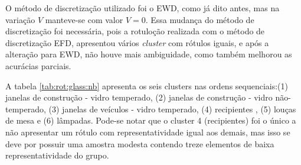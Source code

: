 O método de discretização utilizado foi o EWD, como já dito antes, mas na variação ${V}$  manteve-se com valor ${V=0}$. Essa mudança do método de discretização foi necessária, pois a rotuloção realizada com o método de discretização EFD, apresentou vários \textit{cluster} com rótulos iguais, e após a alteração para EWD, não houve mais ambiguidade, como também melhorou as acurácias parciais. 

A tabela \ref{tab:rot:glass:nb} apresenta os seis clusters nas ordens sequenciais:(1) janelas de construção - vidro temperado, (2) janelas de construção - vidro não-temperado, (3) janelas de veículos - vidro temperado, (4) recipientes , (5) louças de mesa e (6) lâmpadas. Pode-se notar que o cluster 4 (recipientes) foi o único a não apresentar um rótulo com representatividade igual aos demais, mas isso se deve  por possuir  uma amostra modesta contendo  treze elementos de baixa representatividade do grupo.




